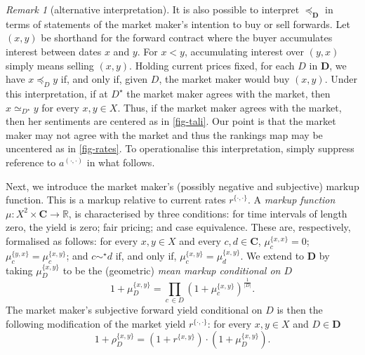 \documentclass[ecta,nameyear,draft]{econsocart}
\newcommand{\R}{\mathbb R}
\newcommand{\mbbd}{{\mathbf D}}
\newcommand{\mbbc}{{\mathbf C}}
\newcommand{\past}{{D^\star}}
\newcommand{\xy}{{(x, y)}}
\newcommand{\dd}{{(\cdot,\cdot)}}
\theoremstyle{plain}
\theoremstyle{remark}
\newtheorem*{remark*}{Remark}
\begin{document}
\begin{remark*}[alternative interpretation] It is also possible to interpret
  $\preceq_\mbbd$ in terms of statements of the market maker's intention to buy
  or sell forwards. Let $(x, y)$ be shorthand for the forward contract where
  the buyer accumulates interest between dates $x$ and $y$. For $x < y$, 
  accumulating interest over $(y, x)$ simply means selling $(x, y)$.  Holding
  current prices fixed, for each $D$ in $ \mbbd$, we have $x \preceq_{D} y$ if,
  and only if, given $D$, the market maker would buy $(x, y)$. Under this
  interpretation, if at $\past$ the market maker agrees with the market, then
  $x \simeq_{\past} y$ for every $x, y \in X$. Thus, if the market maker agrees
  with the market, then her {sentiments} are centered as in \cref{fig-tali}.
  Our point is that the market maker may not agree with the market and thus the
  rankings map may be uncentered as in \cref{fig-rates}.  To operationalise
  this interpretation, simply suppress reference to $a^{\dd}$ in
  what follows.%
\end{remark*}

Next, we introduce the market maker's (possibly negative and subjective) markup
function. This is a markup relative to current rates $r^{\{\cdot, \cdot\}}$.  A
\emph{markup function} $\mu : X^2 \times \mbbc \rightarrow \R$, is
characterised by three conditions: for time intervals of length zero, the yield
is zero; fair pricing; and case equivalence.  These are, respectively,
formalised as follows: for every $x,y\in X$ and every $c , d\in \mbbc$,
$\mu^{\{x,x\}}_{c} = 0$; $\mu^{\{y,x\}}_{c} = \mu^{\{x,y\}}_{c}$; and $c
\sim^{\star} d$ if, and only if, $\mu^{\{x,y\}}_{c} = \mu^{\{x,y\}}_{d}$.  We
extend to $\mbbd$ by taking $\mu^{\{x, y\}}_{D}$ to be the (geometric)
\emph{mean markup conditional on $D$}
\begin{equation*} 1 + \mu^{\{x, y\}}_{D}
  = \prod_{c\,\in D} \left(1 + \mu^{\{x, y\}}_{c}\right)^{\frac{1}{\lvert D
  \rvert}}.
\end{equation*}
The market maker's subjective forward yield conditional on $D$ is then the
following modification of the market yield $r^{\{\cdot,\cdot\}}$: for every
$x,y\in X$ and $D \in \mbbd$
\begin{equation*}
  1 + \rho^{\{x,y\}}_{D} = \left(1 + r^{\{x,y\}}\right)\cdot\left(1 +
  \mu^{\{x,y\}}_{D}\right).
\end{equation*}
\end{document}
